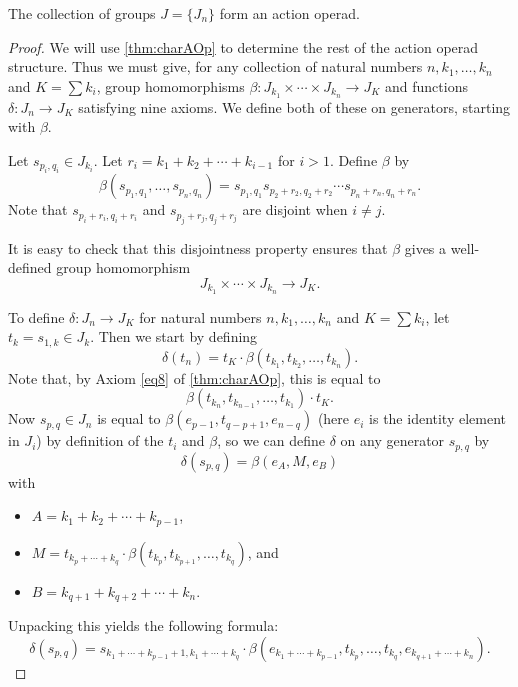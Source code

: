 \begin{thm}\label{J_aop}
The collection of groups $J = \{ J_{n} \}$ form an action operad.
\end{thm}
\begin{proof}
We will use \cref{thm:charAOp} to determine the rest of the action operad structure. Thus we must give, for any collection of natural numbers $n, k_{1}, \ldots, k_{n}$ and $K = \sum k_{i}$, group homomorphisms $\beta \colon J_{k_{1}} \times \cdots \times J_{k_{n}} \rightarrow J_{K}$ and functions $\delta \colon J_{n} \rightarrow J_{K}$ satisfying nine axioms. We define both of these on generators, starting with $\beta$.

Let $s_{p_{i}, q_{i}} \in J_{k_{i}}$. Let $r_{i} = k_{1} + k_{2} + \cdots + k_{i-1}$ for $i > 1$. Define $\beta$ by
  \[
    \beta(s_{p_{1}, q_{1}}, \ldots, s_{p_{n}, q_{n}}) = s_{p_{1}, q_{1}} s_{p_{2}+r_{2}, q_{2}+r_{2}} \cdots s_{p_{n}+r_{n}, q_{n}+r_{n}}.
  \]
Note that $s_{p_{i}+r_{i}, q_{i}+r_{i}}$ and $s_{p_{j}+r_{j}, q_{j}+r_{j}}$ are disjoint when $i \neq j$.

It is easy to check that this disjointness property ensures that $\beta$ gives a well-defined group homomorphism
  \[
    J_{k_{1}} \times \cdots \times J_{k_{n}} \rightarrow J_{K}.
  \]

To define $\delta \colon J_{n} \rightarrow J_{K}$ for natural numbers $n, k_{1}, \ldots, k_{n}$ and $K = \sum k_{i}$, let $t_{k} = s_{1,k} \in J_{k}$. Then we start by defining
  \[
    \delta(t_{n}) = t_{K} \cdot \beta(t_{k_{1}}, t_{k_{2}}, \ldots, t_{k_{n}}).
  \]
Note that, by Axiom \ref{eq8} of \cref{thm:charAOp}, this is equal to
  \[
    \beta(t_{k_{n}}, t_{k_{n-1}}, \ldots, t_{k_{1}}) \cdot t_{K}.
  \]
Now $s_{p,q} \in J_{n}$ is equal to $\beta(e_{p-1}, t_{q-p+1}, e_{n-q})$ (here $e_{i}$ is the identity element in $J_{i}$) by definition of the $t_{i}$ and $\beta$, so we can define $\delta$ on any generator $s_{p,q}$ by
  \[
    \delta(s_{p,q}) = \beta ( e_{A}, M, e_{B} )
  \]
with
  \begin{itemize}
    \item $A = k_{1} + k_{2} + \cdots + k_{p-1}$,
    \item $M = t_{k_{p}+ \cdots +k_{q}} \cdot \beta(t_{k_{p}}, t_{k_{p+1}}, \ldots, t_{k_{q}})$, and
    \item $B = k_{q+1} + k_{q+2} + \cdots + k_{n}$.
  \end{itemize}
Unpacking this yields the following formula:
  \[
  \delta(s_{p,q}) = s_{k_{1}+\cdots+k_{p-1}+1, k_{1}+\cdots+k_{q}} \cdot \beta(e_{k_{1}+\cdots+k_{p-1}}, t_{k_{p}}, \ldots, t_{k_{q}}, e_{k_{q+1}+\cdots+k_{n}}).
  \]


\end{proof}
